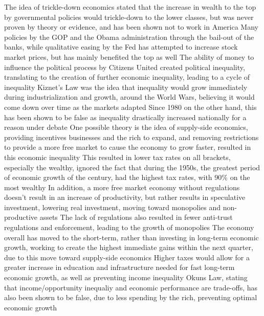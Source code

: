 \documentclass[11 pt, twoside]{article}
\newenvironment{outline*}
{
	\begin{outline}[enumerate]
	}
	{\end{outline}
}
\begin{document}
\begin{outline*}
\1 The idea of trickle-down economics stated that the increase in wealth to the top by governmental policies would trickle-down to the lower classes, but was never proven by theory or evidence, and has been shown not to work in America
\2 Many policies by the GOP and the Obama administration through the bail-out of the banks, while qualitative easing by the Fed has attempted to increase stock market prices, but has mainly benefited the top as well
\2 The ability of money to influence the political process by Citizens United created political inequality, translating to the creation of further economic inequality, leading to a cycle of inequality
\1 Kiznet's Law was the idea that inequality would grow immediately during industrialization and growth, around the World Wars, believing it would come down over time as the markets adapted
\2 Since 1980 on the other hand, this has been shown to be false as inequality drastically increased nationally for a reason under debate
\2 One possible theory is the idea of supply-side economics, providing incentives businesses and the rich to expand, and removing restrictions to provide a more free market to cause the economy to grow faster, resulted in this economic inequality
\2 This resulted in lower tax rates on all brackets, especially the wealthy, ignored the fact that during the 1950s, the greatest period of economic growth of the century, had the highest tax rates, with 90\% on the most wealthy
\2 In addition, a more free market economy without regulations doesn't result in an increase of productivity, but rather results in speculative investment, lowering real investment, moving toward monopolies and non-productive assets
\2 The lack of regulations also resulted in fewer anti-trust regulations and enforcement, leading to the growth of monopolies
\1 The economy overall has moved to the short-term, rather than investing in long-term economic growth, working to create the highest immediate gains within the next quarter, due to this move toward supply-side economics
\2 Higher taxes would allow for a greater increase in education and infrastructure needed for fast long-term economic growth, as well as preventing income inequality
\1 Okuns Law, stating that income/opportunity inequaliy and economic performance are trade-offs, has also been shown to be false, due to less spending by the rich, preventing optimal economic growth
\end{outline*}
\end{document}
